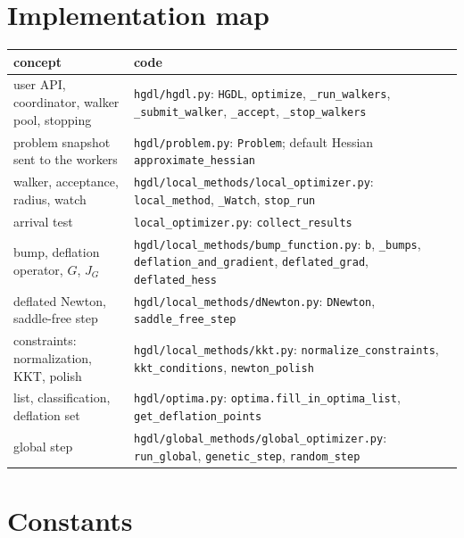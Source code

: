 \documentclass[11pt]{article}
\newcommand{\code}[1]{\texttt{#1}}
\begin{document}
\section{Implementation map}\label{sec:map}

\begin{center}
\small
\begin{tabular}{>{\raggedright\arraybackslash}p{}>{\raggedright\arraybackslash}p{}}
\toprule
concept & code \\
\midrule
user API, coordinator, walker pool, stopping & \code{hgdl/hgdl.py}: \code{HGDL}, \code{optimize}, \code{\_run\_walkers}, \code{\_submit\_walker}, \code{\_accept}, \code{\_stop\_walkers} \\
problem snapshot sent to the workers & \code{hgdl/problem.py}: \code{Problem}; default Hessian \code{approximate\_hessian} \\
walker, acceptance, radius, watch & \code{hgdl/local\_methods/local\_optimizer.py}: \code{local\_method}, \code{\_Watch}, \code{stop\_run} \\
arrival test & \code{local\_optimizer.py}: \code{collect\_results} \\
bump, deflation operator, $G$, $J_G$ & \code{hgdl/local\_methods/bump\_function.py}: \code{b}, \code{\_bumps}, \code{deflation\_and\_gradient}, \code{deflated\_grad}, \code{deflated\_hess} \\
deflated Newton, saddle-free step & \code{hgdl/local\_methods/dNewton.py}: \code{DNewton}, \code{saddle\_free\_step} \\
constraints: normalization, KKT, polish & \code{hgdl/local\_methods/kkt.py}: \code{normalize\_constraints}, \code{kkt\_conditions}, \code{newton\_polish} \\
list, classification, deflation set & \code{hgdl/optima.py}: \code{optima.fill\_in\_optima\_list}, \code{get\_deflation\_points} \\
global step & \code{hgdl/global\_methods/global\_optimizer.py}: \code{run\_global}, \code{genetic\_step}, \code{random\_step} \\
\bottomrule
\end{tabular}
\end{center}

\section{Constants}
\end{document}

